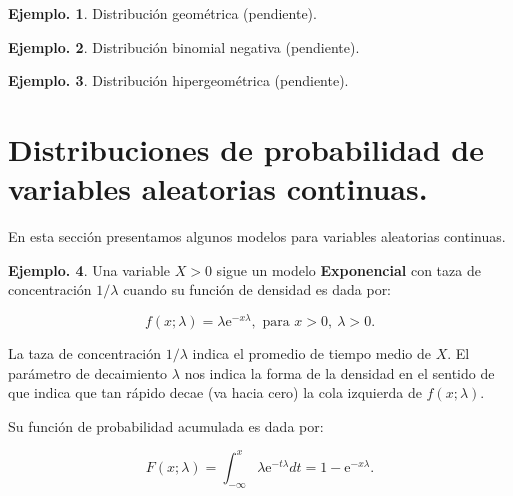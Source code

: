 \documentclass[]{book}
\theoremstyle{definition}
\theoremstyle{definition}
\newtheorem{example}{Ejemplo.}[chapter]
\theoremstyle{definition}
\theoremstyle{remark}
\begin{document}
\begin{example}
\protect\hypertarget{exm:unnamed-chunk-115}{}{\label{exm:unnamed-chunk-115} }
Distribución geométrica (pendiente).
\end{example}

\begin{example}
\protect\hypertarget{exm:unnamed-chunk-116}{}{\label{exm:unnamed-chunk-116} }
Distribución binomial negativa (pendiente).
\end{example}

\begin{example}
\protect\hypertarget{exm:unnamed-chunk-117}{}{\label{exm:unnamed-chunk-117} }
Distribución hipergeométrica (pendiente).
\end{example}

\hypertarget{distribuciones-de-probabilidad-de-variables-aleatorias-continuas.}{%
\section{Distribuciones de probabilidad de variables aleatorias continuas.}\label{distribuciones-de-probabilidad-de-variables-aleatorias-continuas.}}

En esta sección presentamos algunos modelos para variables
aleatorias continuas.

\begin{example}
\protect\hypertarget{exm:unnamed-chunk-118}{}{\label{exm:unnamed-chunk-118} }
Una variable \(X>0\) sigue un modelo \textbf{Exponencial} con taza de
concentración \(1/\lambda\) cuando su función de densidad es dada
por:

\[ f(x;\lambda)= \lambda \mbox{e}^{-x\lambda}, \mbox{ para }
     x>0,\ \lambda>0.     \]

La taza de concentración \(1/\lambda\) indica el promedio de tiempo
medio de \(X\). El parámetro de decaimiento \(\lambda\) nos indica la
forma de la densidad en el sentido de que indica que tan rápido decae
(va hacia cero) la cola izquierda de \(f(x;\lambda)\).

Su función de probabilidad acumulada es dada por:

\[F(x;\lambda)= \int_{-\infty}^{x} \lambda \mbox{e}^{-t\lambda}dt=
    1- \mbox{e}^{-x\lambda}.   \]
\end{example}
\end{document}

